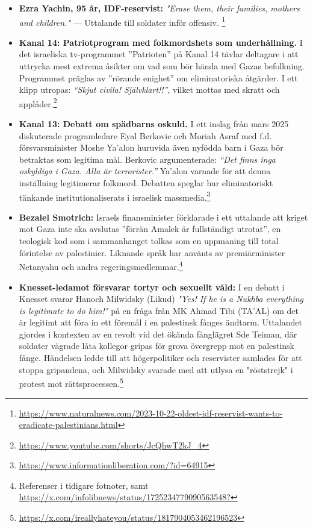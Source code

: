 \begin{itemize}
    \item \textbf{Ezra Yachin, 95 år, IDF-reservist:} \textit{"Erase them, their families, mothers and children."} — Uttalande till soldater inför offensiv. \footnote{\url{https://www.naturalnews.com/2023-10-22-oldest-idf-reservist-wants-to-eradicate-palestinians.html}}

\item \textbf{Kanal 14: Patriotprogram med folkmordshets som underhållning.} I det israeliska tv-programmet ”Patrioten” på Kanal 14 tävlar deltagare i att uttrycka mest extrema åsikter om vad som bör hända med Gazas befolkning. Programmet präglas av ”rörande enighet” om eliminatoriska åtgärder. I ett klipp utropas: \textit{“Skjut civila! Självklart!!”}, vilket mottas med skratt och applåder.\footnote{\url{https://www.youtube.com/shorts/JcQhwT2kJ_4}}

\item \textbf{Kanal 13: Debatt om spädbarns oskuld.} I ett inslag från mars 2025 diskuterade programledare Eyal Berkovic och Moriah Asraf med f.d. försvarsminister Moshe Ya’alon huruvida även nyfödda barn i Gaza bör betraktas som legitima mål. Berkovic argumenterade: \textit{“Det finns inga oskyldiga i Gaza. Alla är terrorister.”} Ya’alon varnade för att denna inställning legitimerar folkmord. Debatten speglar hur eliminatoriskt tänkande institutionaliserats i israelisk massmedia.\footnote{\url{https://www.informationliberation.com/?id=64915}}

\item \textbf{Bezalel Smotrich:} Israels finansminister förklarade i ett uttalande att kriget mot Gaza inte ska avslutas ”förrän Amalek är fullständigt utrotat”, en teologisk kod som i sammanhanget tolkas som en uppmaning till total förintelse av palestinier. Liknande språk har använts av premiärminister Netanyahu och andra regeringsmedlemmar.\footnote{Referenser i tidigare fotnoter, samt \url{https://x.com/infolibnews/status/1725234779090563548?}}

\item \textbf{Knesset-ledamot försvarar tortyr och sexuellt våld:} I en debatt i Knesset svarar Hanoch Milwidsky (Likud) \textit{"Yes! If he is a Nukhba everything is legitimate to do him!"} på en fråga från MK Ahmad Tibi (TA'AL) om det är legitimt att föra in ett föremål i en palestinsk fånges ändtarm. Uttalandet gjordes i kontexten av en revolt vid det ökända fånglägret Sde Teiman, där soldater vägrade låta kollegor gripas för grova övergrepp mot en palestinsk fånge. Händelsen ledde till att högerpolitiker och reservister samlades för att stoppa gripandena, och Milwidsky svarade med att utlysa en "röststrejk" i protest mot rättsprocessen.\footnote{\url{https://x.com/ireallyhateyou/status/1817904053462196523}}


\end{itemize}
